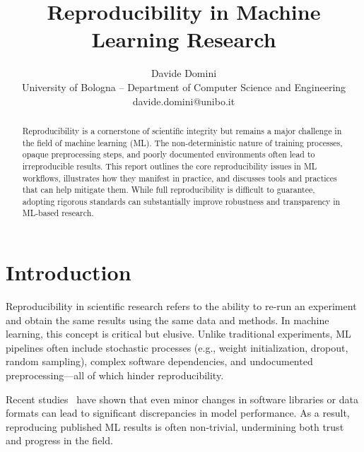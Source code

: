 \documentclass[11pt]{article}
\begin{document}
%
\title{Reproducibility in Machine Learning Research}
\author{Davide Domini \\
University of Bologna -- Department of Computer Science and Engineering\\
davide.domini@unibo.it
}
\maketitle



\begin{abstract}
Reproducibility is a cornerstone of scientific integrity but remains a major challenge 
 in the field of machine learning (ML). 
%
The non-deterministic nature of training processes, opaque preprocessing steps, 
 and poorly documented environments often lead to irreproducible results. 
%
This report outlines the core reproducibility issues in ML workflows, 
 illustrates how they manifest in practice, and discusses tools 
 and practices that can help mitigate them. 
% 
While full reproducibility is difficult to guarantee, adopting rigorous standards 
 can substantially improve robustness and transparency in ML-based research.
\end{abstract}

\section{Introduction}
\label{sec:introduction}
Reproducibility in scientific research refers to the ability to re-run an experiment and 
 obtain the same results using the same data and methods. 
% 
In machine learning, this concept is critical but elusive. 
%
Unlike traditional experiments, ML pipelines often include stochastic processes 
 (e.g., weight initialization, dropout, random sampling), complex software dependencies, 
 and undocumented preprocessing---all of which hinder reproducibility.

Recent studies~\cite{DBLP:journals/ncs/X21i,DBLP:conf/qrs/Rivera-LandosKN21} have shown that even minor changes 
 in software libraries or data formats can lead to significant discrepancies in model performance. 
% 
As a result, reproducing published ML results is often non-trivial, 
 undermining both trust and progress in the field.
\end{document}
